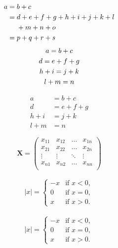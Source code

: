 \documentclass{article}
\begin{document}
	
	\begin{align}
	a ={} & b + c \\
	={} & d + e + f + g + h + i
	+ j + k + l \notag \\
	& + m + n + o \\
	={} & p + q + r + s
	\end{align}
	\begin{gather}
	a = b + c \\
	d = e + f + g \\
	h + i = j + k \notag \\
	l + m = n
	\end{gather}
	
	
	\begin{equation}
	\begin{aligned}
	a &= b + c \\
	d &= e + f + g \\
	h + i &= j + k \\
	l + m &= n
	\end{aligned}
	\end{equation}
	
	
	\[ \mathbf{X} = \left(
	\begin{array}{cccc}
	x_{11} & x_{12} & \ldots & x_{1n}\\
	x_{21} & x_{22} & \ldots & x_{2n}\\
	\vdots & \vdots & \ddots & \vdots\\
	x_{n1} & x_{n2} & \ldots & x_{nn}\\
	\end{array} \right) \]
	
	\begin{equation}
	\begin{aligned}
	|x| = \left\{
		\begin{array}{rl}
		-x & \text{if } x < 0,\\
		0 & \text{if } x = 0,\\
		x & \text{if } x > 0.
		\end{array} \right. 
	\end{aligned}
	\end{equation}
	
		\begin{equation}
		\begin{aligned}
|x| =
\begin{cases}
-x & \text{if } x < 0,\\
0 & \text{if } x = 0,\\
x & \text{if } x > 0.
\end{cases} 
		\end{aligned}
		\end{equation}
	
\end{document}
